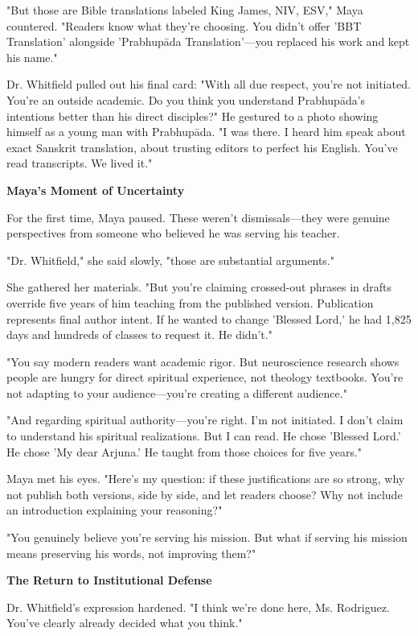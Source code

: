 \documentclass[12pt,twoside]{book}
\begin{document}
"But those are Bible translations labeled King James, NIV, ESV," Maya countered. "Readers know what they're choosing. You didn't offer 'BBT Translation' alongside 'Prabhupāda Translation'—you replaced his work and kept his name."

Dr. Whitfield pulled out his final card: "With all due respect, you're not initiated. You're an outside academic. Do you think you understand Prabhupāda's intentions better than his direct disciples?" He gestured to a photo showing himself as a young man with Prabhupāda. "I was there. I heard him speak about exact Sanskrit translation, about trusting editors to perfect his English. You've read transcripts. We lived it."

\textbf{\textbf{Maya's Moment of Uncertainty}}

For the first time, Maya paused. These weren't dismissals—they were genuine perspectives from someone who believed he was serving his teacher.

"Dr. Whitfield," she said slowly, "those are substantial arguments."

She gathered her materials. "But you're claiming crossed-out phrases in drafts override five years of him teaching from the published version. Publication represents final author intent. If he wanted to change 'Blessed Lord,' he had 1,825 days and hundreds of classes to request it. He didn't."

"You say modern readers want academic rigor. But neuroscience research shows people are hungry for direct spiritual experience, not theology textbooks. You're not adapting to your audience—you're creating a different audience."

"And regarding spiritual authority—you're right. I'm not initiated. I don't claim to understand his spiritual realizations. But I can read. He chose 'Blessed Lord.' He chose 'My dear Arjuna.' He taught from those choices for five years."

Maya met his eyes. "Here's my question: if these justifications are so strong, why not publish both versions, side by side, and let readers choose? Why not include an introduction explaining your reasoning?"

"You genuinely believe you're serving his mission. But what if serving his mission means preserving his words, not improving them?"

\textbf{\textbf{The Return to Institutional Defense}}

Dr. Whitfield's expression hardened. "I think we're done here, Ms. Rodriguez. You've clearly already decided what you think."
\end{document}
